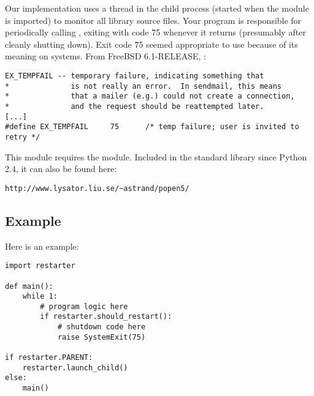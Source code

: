 Our implementation uses a thread in the child process (started when the module
is imported) to monitor all library source files. Your program is responsible
for periodically calling , exiting with code 75 whenever it
returns  (presumably after cleanly shutting down). Exit code 75
seemed appropriate to use because of its meaning on \UNIX{} systems. From
FreeBSD 6.1-RELEASE, :

\begin{verbatim}
EX_TEMPFAIL -- temporary failure, indicating something that
*              is not really an error.  In sendmail, this means
*              that a mailer (e.g.) could not create a connection,
*              and the request should be reattempted later.
[...]
#define EX_TEMPFAIL     75      /* temp failure; user is invited to retry */
\end{verbatim}

This module requires the  module. Included in the standard
library since Python 2.4, it can also be found here:

\begin{verbatim}
http://www.lysator.liu.se/~astrand/popen5/
\end{verbatim}


\subsection{Example \label{example}}

Here is an example:

\begin{verbatim}
import restarter

def main():
    while 1:
        # program logic here
        if restarter.should_restart():
            # shutdown code here
            raise SystemExit(75)

if restarter.PARENT:
    restarter.launch_child()
else:
    main()
\end{verbatim}